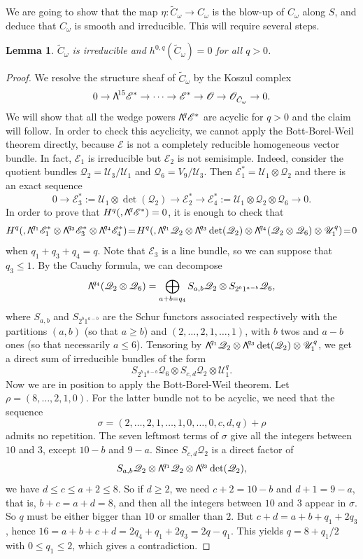 \documentclass[11pt]{article}
\newcommand{\NoChangel}[1]{%
\expandafter\let\csname old\string#1\endcsname=#1
\let#1=\relax
\newcommand{#1}{\mathcode`l="716C\csname old\string#1\endcsname\mathcode`l="7160 }%
}
\newcommand\bw[1]{{\hbox{\large$\mathsf{\Lambda}$}^{\!#1}}}
\let\mathcal\mathscr
\theoremstyle{plain}
\newtheorem{lemma}[theorem]{Lemma}
\theoremstyle{definition}
\DeclareMathOperator{\Fl}{Fl}\NoChangel{\Fl}
\newcommand{\sheaf}[1]{\mathcal{#1}}
\newcommand{\ke}{\sheaf{E}}
\newcommand{\ko}{\sheaf{O}}\let\OO\ko\let\cO\ko
\newcommand{\kq}{\sheaf{Q}}
\newcommand{\ku}{\sheaf{U}}
\begin{document}
We are going to show that the map $\eta: \tilde{C}_{\omega} \to C_\omega$ is the blow-up of $C_\omega$ along $S$,
and deduce that $C_\omega$ is smooth and irreducible. This will require several steps.

\begin{lemma}\label{van}
$\tilde C_\omega$ is irreducible and $h^{0,q}(\tilde C_\omega)=0$ for all $q>0$.
\end{lemma}

\begin{proof}
We resolve the structure sheaf of $\tilde C_\omega$ by the Koszul complex
\begin{equation*}\label{koszulctilde}
0\to \bw{15}\ke^*\to\cdots \to \ke^*\to\ko_{\Fl}\to \ko_{\tilde C_\omega}\to 0.
\end{equation*}
We will show that all the wedge powers $\bw{q}\ke^*$ are acyclic for $q>0$ and the claim will follow.
In order to check this acyclicity, we cannot apply the Bott-Borel-Weil theorem directly, because $\ke$ is not a completely reducible
homogeneous vector bundle. In fact, $\ke_1$ is irreducible but $\ke_2$ is not semisimple. Indeed, consider the
quotient bundles $\kq_2=\ku_3/\ku_1$ and $\kq_6=V_9/\ku_3$. Then $\ke_1^*=\ku_1\otimes \kq_2$ and there is an exact sequence
\[
 0\to \ke_3^*:=\ku_1\otimes \det(\kq_2)\to \ke_2^*\to \ke_4^*:=\ku_1\otimes \kq_2\otimes \kq_6\to 0.
\]
In order to prove that $H^q(\Fl,\bw{q}\ke^*)=0$, it is enough to check that
\[
H^q(\Fl,\bw{q_1}\ke_1^*\otimes\bw{q_3}\ke_3^*\otimes \bw{q_4}\ke_4^*)\!=\!
H^q(\Fl,\bw{q_1}\kq_2\otimes\bw{q_3}\det(\kq_2)\otimes \bw{q_4}(\kq_2\otimes \kq_6)\otimes \ku_1^q)\!=\!0
\]
when $q_1+q_3+q_4=q$. Note that $\ke_3$ is a line bundle, so we can suppose that $q_3\le 1$.
By the Cauchy formula, we can decompose
\[
\bw{q_4}(\kq_2\otimes \kq_6)=\bigoplus_{a+b=q_4}S_{a,b}\kq_2\otimes S_{2^b1^{a-b}}\kq_6,
\]
where $S_{a,b}$ and $S_{2^b1^{a-b}}$ are the Schur functors associated respectively with the partitions
$(a,b)$ (so that $a\ge b$) and $(2,\ldots ,2,1,\ldots ,1)$, with $b$ twos and $a-b$ ones (so that necessarily $a\le 6$). Tensoring by
$\bw{q_1}\kq_2\otimes\bw{q_3}\det(\kq_2)\otimes \ku_1^q$, we get a direct sum of irreducible bundles
of the form
\[
S_{2^b1^{a-b}}\kq_6\otimes S_{c,d}\kq_2\otimes \ku_1^q.
\]
Now we are in position to apply the Bott-Borel-Weil theorem. Let $\rho=(8,\ldots ,2,1,0)$. For the latter bundle not
to be acyclic, we need that the sequence \[
\sigma =(2,\ldots ,2,1,\ldots ,1,0,\ldots ,0,c,d,q)+\rho
\]
admits no repetition. The seven leftmost terms of $\sigma$ give all the integers between $10$ and $3$, except
$10-b$ and $9-a$. Since $S_{c,d}\kq_2$ is a direct factor of
\[
S_{a,b}\kq_2\otimes \bw{q_1}\kq_2\otimes\bw{q_3}\det(\kq_2),
\]
we have $d\le c\le a+2\le 8$. So if $d\ge 2$, we need $c+2=10-b$ and $d+1=9-a$, that is, $b+c=a+d=8$, and then all
the integers between $10$ and $3$ appear in $\sigma$. So $q$ must be either bigger than $10$ or smaller than $2$.
But $c+d=a+b+q_1+2q_3$, hence $16=a+b+c+d=2q_4+q_1+2q_3=2q-q_1$. This yields $q=8+q_1/2$ with $0\le q_1\le 2$, which
gives a contradiction.


\end{proof}
\end{document}

